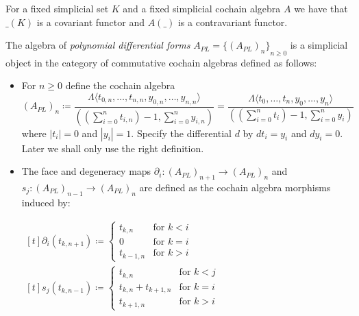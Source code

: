  \begin{Remark}
  For a fixed simplicial set $K$ and a fixed simplicial cochain algebra $A$ we have that $\_(K)$ is a covariant functor and
  $A(\_)$ is a contravariant functor.
 \end{Remark}

 \begin{Definition}
  The algebra of \emph{polynomial differential forms} $A_{PL} = {\lbrace (A_{PL})_n\rbrace}_{n \geq 0}$ is a
  simplicial object in the category of commutative cochain algebras defined as follows: 
  
  \begin{itemize}
   \item For $n \geq 0$ define the cochain algebra 
      $$(A_{PL})_n \coloneqq \frac{\Lambda \langle t_{0,n}, \dotsc, t_{n,n}, y_{0,n}, \dotsc, y_{n,n} \rangle}
      {((\sum_{i = 0}^n t_{i,n}) - 1, \sum_{i = 0}^n y_{i,n})}
      = \frac{\Lambda \langle t_0, \dotsc, t_n, y_0, \dotsc, y_n \rangle}
      {((\sum_{i = 0}^n t_i) - 1, \sum_{i = 0}^n y_i)} $$
      where $|t_i| = 0$ and $|y_i| = 1$. Specify the differential $d$ by $dt_i = y_i$ and $dy_i = 0$. Later we shall only use the right
      definition.
   \item The face and degeneracy maps 
   $ \partial_i \colon (A_{PL})_{n+1} \to (A_{PL})_n$ and $ s_j \colon (A_{PL})_{n-1} \to (A_{PL})_n$
   are defined as the cochain algebra morphisms induced by:
   
    \begin{center}
      \hfill
      $\!\begin{aligned}[t]
       \partial_i (t_{k,n+1}) \coloneqq \begin{cases}
                                      t_{k,n}  	&\text{for $k < i$} \\
                                      0		&\text{for $k = i$}\\
                                      t_{k-1,n} &\text{for $k > i$}
				      \end{cases}
      \end{aligned}$\hfill\hfill
      $\!\begin{aligned}[t]
       s_j (t_{k,n-1}) \coloneqq \begin{cases}
                                      t_{k,n}  			&\text{for $k < j$} \\
                                      t_{k,n} + t_{k+1,n}	&\text{for $k = i$}\\
                                      t_{k+1,n} 		&\text{for $k > i$}
				      \end{cases}
      \end{aligned}$\hfill
    \end{center}    
  \end{itemize}
 \end{Definition}


